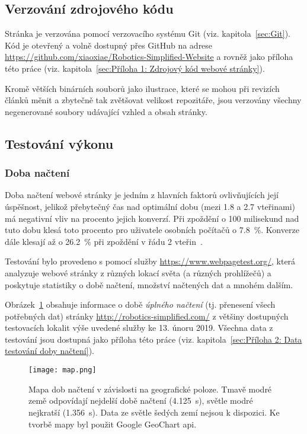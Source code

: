 \documentclass[a4paper, 12pt]{article}
\begin{document}
  \subsection{Verzování zdrojového kódu}
  Stránka je verzována pomocí verzovacího systému Git (viz. kapitola~\ref{sec:Git}). Kód je otevřený a volně dostupný přes GitHub na adrese \url{https://github.com/xiaoxiae/Robotics-Simplified-Website} a rovněž jako příloha této práce (viz. kapitola~\ref{sec:Příloha 1: Zdrojový kód webové stránky}).

  Kromě větších binárních souborů jako ilustrace, které se mohou při revizích článků měnit a zbytečně tak zvětšovat velikost repozitáře, jsou verzovány všechny negenerované soubory udávající vzhled a obsah stránky.


  \subsection{Testování výkonu}


  \subsubsection{Doba načtení}
  Doba načtení webové stránky je jedním z hlavních faktorů ovlivňujících její úspěšnost, jelikož přebytečný čas nad optimální dobu (mezi \num{1.8} a \num{2.7} vteřinami) má negativní vliv na procento jejich konverzí. Při zpoždění o \num{100} milisekund nad tuto dobu klesá toto procento pro uživatele osobních počítačů o \SI{7.8}{\percent}. Konverze dále klesají až o \SI{26.2}{\percent} při zpoždění v řádu \num{2} vteřin~\cite{conversion-rate-statistics}.

  Testování bylo provedeno s pomocí služby \url{https://www.webpagetest.org/}, která analyzuje webové stránky z různých lokací světa (a různých prohlížečů) a poskytuje statistiky o době načtení, množství načtených dat a mnohém dalším.

  Obrázek~\ref{img:Mapa dob načtení v závislosti na geografické poloze} obsahuje informace o době \emph{úplného načtení} (tj. přenesení všech potřebných dat) stránky \url{http://robotics-simplified.com/} z většiny dostupných testovacích lokalit výše uvedené služby ke 13. únoru 2019. Všechna data z testování jsou dostupná jako příloha této práce (viz. kapitola~\ref{sec:Příloha 2: Data testování doby načtení}).

  \begin{figure}[H]
    \texttt{[image: map.png]}
    \caption[Mapa dob načtení v závislosti na geografické poloze]{Mapa dob načtení v závislosti na geografické poloze. Tmavě modré země odpovídají nejdelší době načtení (\SI{4.125}{\second}), světle modré nejkratší (\SI{1.356}{\second}). Data ze světle šedých zemí nejsou k dispozici. Ke tvorbě mapy byl použit Google GeoChart \acrshort{api}.} \label{img:Mapa dob načtení v závislosti na geografické poloze}
  \end{figure}
\end{document}
